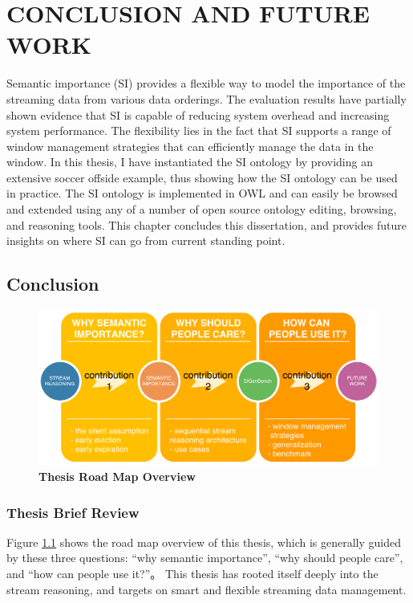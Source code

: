  
\chapter{CONCLUSION AND FUTURE WORK}
Semantic importance (SI) provides a flexible way to model the importance of the streaming data from various data orderings.
The evaluation results have partially shown evidence that SI is capable of reducing system overhead and increasing system performance. 
The flexibility lies in the fact that SI supports a range of window management strategies that can efficiently manage the data in the window. 
In this thesis, I have instantiated the SI ontology by providing an extensive soccer offside example, thus showing how the SI ontology can be used in practice.
The SI ontology is implemented in OWL and can easily be browsed and extended using any of a number of open source ontology editing, browsing, and reasoning tools.
This chapter concludes this dissertation, and provides future insights on where SI can go from current standing point. 
%
\section{Conclusion}

\begin{figure}[!htbp]
	\centering
    \includegraphics[width=5in]{img/7-trm.pdf}
    \caption{\textbf{Thesis Road Map Overview}}
    \label{fig:7-trm}
\end{figure}
%
\subsection{Thesis Brief Review}
Figure \ref{fig:7-trm} shows the road map overview of this thesis, which is generally guided by these three questions: 
``why semantic importance'', ``why should people care'', and ``how can people use it?''。
This thesis has rooted itself deeply into the stream reasoning, and targets on smart and flexible streaming data management. 

